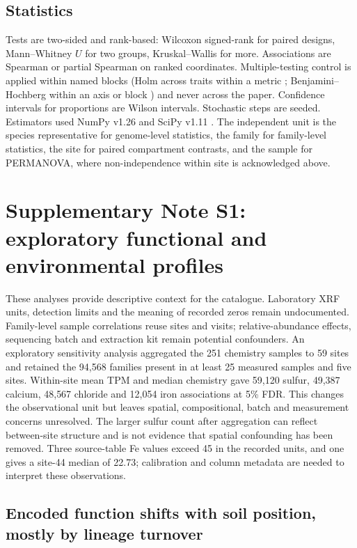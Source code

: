 \documentclass[11pt]{article}
\begin{document}
\subsection*{Statistics}
Tests are two-sided and rank-based: Wilcoxon signed-rank for paired designs, Mann--Whitney $U$ for
two groups, Kruskal--Wallis for more. Associations are Spearman or partial Spearman on ranked
coordinates. Multiple-testing control is applied within named blocks (Holm across traits within a
metric \citep{holm1979multiple}; Benjamini--Hochberg within an axis or block \citep{benjamini1995fdr})
and never across the paper. Confidence intervals for proportions are Wilson intervals. Stochastic
steps are seeded. Estimators used NumPy v1.26 \citep{harris2020numpy} and SciPy v1.11
\citep{virtanen2020scipy}. The independent unit is the species representative for genome-level
statistics, the family for family-level statistics, the site for paired compartment contrasts, and
the sample for PERMANOVA, where non-independence within site is acknowledged above.

\section*{Supplementary Note S1: exploratory functional and environmental profiles}
These analyses provide descriptive context for the catalogue. Laboratory XRF units, detection
limits and the meaning of recorded zeros remain undocumented. Family-level sample correlations
reuse sites and visits; relative-abundance effects, sequencing batch and extraction kit remain
potential confounders. An exploratory sensitivity analysis aggregated the 251 chemistry samples to 59 sites and retained the 94{,}568 families present in at least 25 measured samples and five sites. Within-site mean TPM and median chemistry gave 59{,}120 sulfur, 49{,}387 calcium, 48{,}567 chloride and 12{,}054 iron associations at 5\% FDR. This changes the observational unit but leaves spatial, compositional, batch and measurement concerns unresolved. The larger sulfur count after aggregation can reflect between-site structure and is not evidence that spatial confounding has been removed. Three source-table Fe values exceed 45 in the recorded units, and one gives a site-44 median of 22.73; calibration and column metadata are needed to interpret these observations.

\subsection*{Encoded function shifts with soil position, mostly by lineage turnover}
\end{document}
